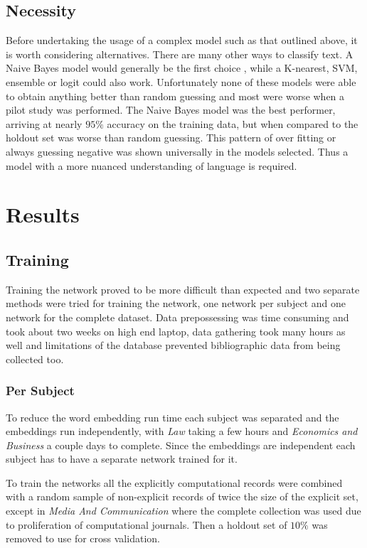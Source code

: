 \documentclass[12pt, a4paper]{article}
\begin{document}
 \subsection{Necessity}\label{ness}

Before undertaking the usage of a complex model such as that outlined above, it is worth considering alternatives. There are many other ways to classify text. A Naive Bayes model would generally be the first choice \citep{mccallum1998comparison}, while a K-nearest, SVM, ensemble or logit could also work. Unfortunately none of these models were able to obtain anything better than random guessing and most were worse when a pilot study was performed. The Naive Bayes model was the best performer, arriving at nearly $95\%$ accuracy on the training data, but when compared to the holdout set was worse than random guessing. This pattern of over fitting  or always guessing negative was shown universally in the models selected. Thus a model with a more nuanced understanding of language is required.

\section{Results}

\subsection{Training}

Training the network proved to be more difficult than expected and two separate methods were tried for training the network, one network per subject and one network for the complete dataset. Data prepossessing was time consuming and took about two weeks on high end laptop, data gathering took many hours as well and limitations of the database prevented bibliographic data from being collected too. 

\subsubsection{Per Subject}

To reduce the word embedding run time each subject was separated and the embeddings run independently, with \textit{Law} taking a few hours and \textit{Economics and Business} a couple days to complete. Since the embeddings are independent each subject has to have a separate network trained for it.

To train the networks all the explicitly computational records were combined with a random sample of non-explicit records of twice the size of the explicit set, except in \textit{Media And Communication} where the complete collection was used due to proliferation of computational journals. Then a holdout set of $10\%$ was removed to use for cross validation.
\end{document}
